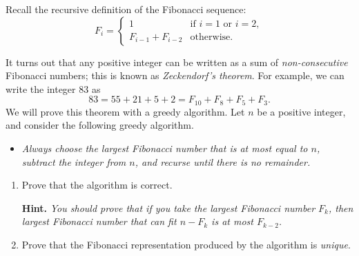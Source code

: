 \documentclass{article}
\begin{document}
\begin{question}
Recall the recursive definition of the Fibonacci sequence: \[F_i = \begin{cases}1 & \text{if } i = 1 \text{ or } i = 2, \\ F_{i - 1} + F_{i - 2} & \text{otherwise.}\end{cases}\]

It turns out that any positive integer can be written as a sum of {\em non-consecutive} Fibonacci numbers; this is known as {\em Zeckendorf's theorem}. For example, we can write the integer 83 as \[83 = 55 + 21 + 5 + 2 = F_{10} + F_8 + F_5 + F_3.\] We will prove this theorem with a greedy algorithm. Let $n$ be a positive integer, and consider the following greedy algorithm.

\begin{itemize}
    \item[] {\em Always choose the largest Fibonacci number that is at most equal to $n$, subtract the integer from $n$, and recurse until there is no remainder.}
\end{itemize}

\begin{enumerate}[label = (\alph*)]
    \item Prove that the algorithm is correct.

    {\bfseries Hint.} {\em You should prove that if you take the largest Fibonacci number $F_k$, then largest Fibonacci number that can fit $n - F_k$ is at most $F_{k - 2}$.}

    \item Prove that the Fibonacci representation produced by the algorithm is {\em unique}.
\end{enumerate}
\end{question}
\end{document}
